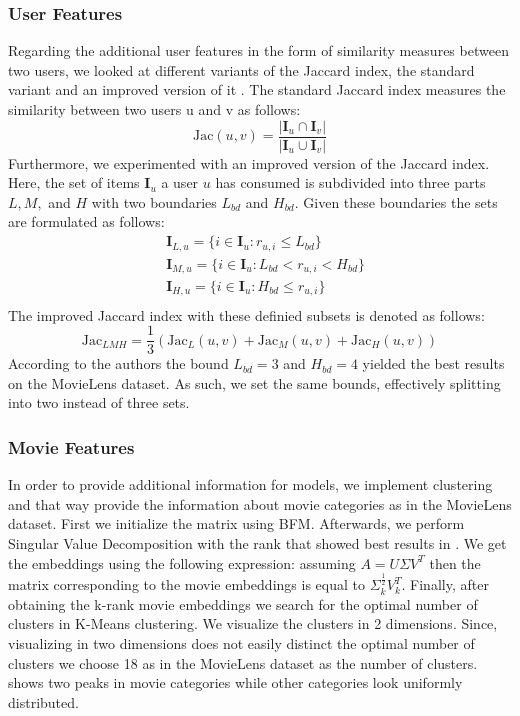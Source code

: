 \documentclass[10pt,conference,compsocconf]{IEEEtran}
\begin{document}
    \subsubsection{User Features}
    Regarding the additional user features in the form of similarity measures between two users, we looked at different variants of the Jaccard index, the standard variant and an improved version of it \cite{lee_improving_2017}.
    The standard Jaccard index measures the similarity between two users u and v as follows:
    $$\text{Jac}(u,v)=\frac{|\mathbf{I}_u \cap \mathbf{I}_v|}{|\mathbf{I}_u \cup \mathbf{I}_v|}$$
    Furthermore, we experimented with an improved version of the Jaccard index.
    Here, the set of items $\mathbf{I}_u$ a user $u$ has consumed is subdivided into three parts $L,M,$ and $H$ with two boundaries $L_{bd}$ and $H_{bd}$.
    Given these boundaries the sets are formulated as follows:
    \begin{align*}
        &\mathbf{I}_{L,u}=\{i \in \mathbf{I}_u : r_{u,i} \leq L_{bd}\}\\
        &\mathbf{I}_{M,u}=\{i \in \mathbf{I}_u : L_{bd} < r_{u,i} < H_{bd}\}\\
        &\mathbf{I}_{H,u}=\{i \in \mathbf{I}_u : H_{bd} \leq r_{u,i}\}\\
    \end{align*}
    The improved Jaccard index with these definied subsets is denoted as follows:
    $$\text{Jac}_{LMH}=\frac{1}{3}(\text{Jac}_L(u,v) + \text{Jac}_M(u,v) + \text{Jac}_H(u,v))$$
    According to the authors the bound $L_{bd} = 3$ and $H_{bd}=4$ yielded the best results on the MovieLens dataset.
    As such, we set the same bounds, effectively splitting into two instead of three sets.

    \subsubsection{Movie Features}
    In order to provide additional information for models, we implement clustering and that way provide the information
    about movie categories as in the MovieLens dataset. First we initialize the matrix using BFM.
    Afterwards, we perform Singular Value Decomposition with the rank that showed best results in .
    We get the embeddings using the following expression: assuming $A=U\Sigma V^T$ then the matrix corresponding to the movie embeddings is equal to $\Sigma _k ^{\frac{1}{2}} V_k ^T$.
    Finally, after obtaining the k-rank movie embeddings we search for the optimal number of clusters in K-Means clustering.
    We visualize the clusters in 2 dimensions. Since, visualizing in two dimensions does not easily distinct the optimal
    number of clusters we choose 18 as in the MovieLens dataset as the number of clusters. 
    shows two peaks in movie categories while other categories look uniformly distributed.
\end{document}
